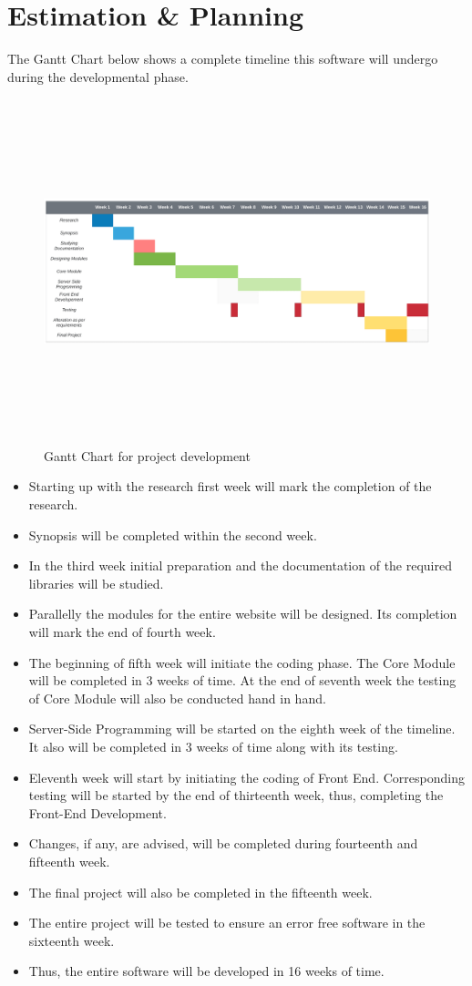 \chapter{Estimation \& Planning}
{
	The Gantt Chart below shows a complete timeline this software will undergo during the developmental phase. \\
	\begin{figure}[h]
		\includegraphics[width=\linewidth,height=10cm]{media/gantt_chart.png}
		\caption{Gantt Chart for project development}
	\end{figure}
	\begin{itemize}
		\item Starting up with the research first week will mark the completion of the research. 
		\item Synopsis will be completed within the second week.
		\item In the third week initial preparation and the documentation of the required libraries will be studied.
		\item Parallelly the modules for the entire website will be designed. Its completion will mark the end of fourth week.
		\item The beginning of fifth week will initiate the coding phase. The Core Module will be completed in 3 weeks of time. At the end of seventh week the testing of Core Module will also be conducted hand in hand.
		\item Server-Side Programming will be started on the eighth week of the timeline. It also will be completed in 3 weeks of time along with its testing.
		\item Eleventh week will start by initiating the coding of Front End. Corresponding testing will be started by the end of thirteenth week, thus, completing the Front-End Development.
		\item Changes, if any, are advised, will be completed during fourteenth and fifteenth week.
		\item The final project will also be completed in the fifteenth week.
		\item The entire project will be tested to ensure an error free software in the sixteenth week.
		\item Thus, the entire software will be developed in 16 weeks of time.
	\end{itemize}
}